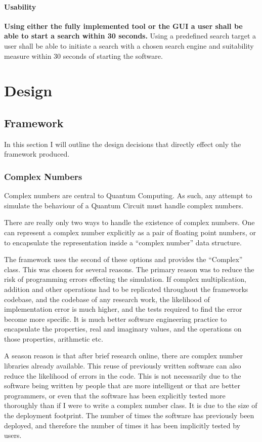 \documentclass[authoryearcitations]{UoYCSproject}
\begin{document}
\subsubsection{Usability}
\textbf{Using either the fully implemented tool or the GUI a user shall be able to start a search within 30 seconds.}
Using a predefined search target a user shall be able to initiate a search with a chosen search engine and suitability measure within 30 seconds of starting the software.

\chapter{Design}

\section{Framework}
In this section I will outline the design decisions that directly effect only the framework produced.

\subsection{Complex Numbers}
Complex numbers are central to Quantum Computing.
As such, any attempt to simulate the behaviour of a Quantum Circuit must handle complex numbers.

There are really only two ways to handle the existence of complex numbers.
One can represent a complex number explicitly as a pair of floating point numbers, or to encapsulate the representation inside a ``complex number'' data structure.

The framework uses the second of these options and provides the ``Complex'' class.
This was chosen for several reasons.
The primary reason was to reduce the risk of programming errors effecting the simulation.
If complex multiplication, addition and other operations had to be replicated throughout the frameworks codebase, and the codebase of any research work, the likelihood of implementation error is much higher, and the tests required to find the error become more specific.
It is much better software engineering practice to encapsulate the properties, real and imaginary values, and the operations on those properties, arithmetic etc.

A season reason is that after brief research online, there are complex number libraries already available.
This reuse of previously written software can also reduce the likelihood of errors in the code.
This is not necessarily due to the software being written by people that are more intelligent or that are better programmers, or even that the software has been explicitly tested more thoroughly than if I were to write a complex number class.
It is due to the size of the deployment footprint.
The number of times the software has previously been deployed, and therefore the number of times it has been implicitly tested by users.
\end{document}

